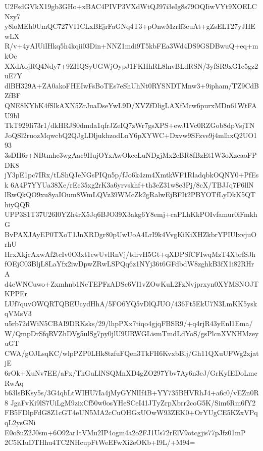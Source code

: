 U2FsdGVkX19gb3GHo+xBAC4PIVP3VXdWtQJ97i3eIg8s79OQIiwVYt9XOELCNzy7
y8loMEh0UmQC727VI1CLxBEjrFaGNq4T3+pOnwMzrff3euAt+gZsELT27yJHEwLX
R/v+4yAIUiIHkq5h4kqii03Din+NNZ1mdi9T5kbFEa3Wd4DS9GSDBwuQ+eq+mkOc
XXdAojRQ4Ndy7+9ZHQSyUGWjOypJ1FKHhRL8lnvBLdRSN/3yfSR9xG1e5gz2uE7Y
dlBH329A+ZA0akoFHEIwFsBoTEs7eShUhNt0RYSNDTMnw3+9ipham/TZ9CdBZfBF
QNE8KYhK4fSlkAXN5ZrJuaDseYwL9D/XVZfDligLAXfMcw6purxMDn61WtFAU9bl
TkT929Ii73r1/dkHRJS0dmda1qfrJZeIQ7zWr7gsXPS+ewJ1Vc0RZGob8dpVsjTN
JoQSl2ruozMqwcbQ2QJgLDljukhzodLnY6pXYWC+Dxvw9SFzve9j4mlhxQ2UO193
3sDH6r+NBtmhc3wgAac9HujOYxAwOkccLuNDgjMx2eBR8fBzEt1W3oXzcaoFPDK8
jY3pE1pc7IRx/tLShQJeNGsPIQn5p/fJo6k4zm4XmtkWF1RladqbkOQNY0+PfEsk
6A4P7YYUa38Xe/rEc35xg2rK3a6yrvskhf+th3eZ31w8e3Pj/8cX/TBJJq7F6llN
lRwQkQO9xu8yaIOum8WmLQVz39WMcZk2gRalwEjBFIt2PBYOTfLyDkK5QThiyQQR
UPP3S1T37U26I0YZh4rX5Jq6BJO39X3akg6Y8emj+caPLhKkPOIvfamur0iFmkhG
BvPAXJAyEP0TXoT1JnXRDgr80pUwUoA4LrI9k4VvgKiKiXHZkbrYPIUlxvjuOrhU
HrxXkjcAxwAf2tcIv0O3xt1cwUvlRnVj/tdrvH5Gt+qXDPSfCFIwqMzT4XbrfSJh
fOEjC03BljL8LaYfx2iwDpwZRwLSPQq6z1NYj36t6GFdbdW8zghkB3fX1i82RHrA
d4eWNCuwo+Zxmhnb1NeTEPFzADSc6Vl1vZOwKuL2FzNvjprxyn0XYMSNOJTKPPEr
LUf7quvOWQRTQBEUcydHhA/5FO6YQ5vDlQJUO/436Ft5EkU7N3LmKK5yskqVMsV3
u5rb72dWiN5CBAI9DRKsks/29/lhpPXx7tiqo4gjqFBSR9/+q4rjR43yEnl1Ema/
W/QmpDrSfqRVZhDVg5ulSg7py0jlU9URWGLismTmdLdYoS/gsPlcnXVNHMzeyuGT
CWA/gOJLsqKC/wlpPZP0LHk8tzfuFQen3TkFH6KvxbBlj/Gh11QXuUFWg2xjatjE
6rOk+XuNv7EE/aFx/TkGuLlNSQMnXD4gZO297Ybv7Ay6n3eJ/GrKyIEDoLmcRwAq
b63lsBKsy5s/3G4qbLtWIHU7Ia4jMyGYNlIf4B+YY735BHVRhJ4+a6c0/vEZn0R8
JgaFvKi9lS7UiLgM9zixCf50w0osYHeSCeI41JTyZrpXbrr2coG5K/Sim6Rm6fY2
FB5FDlpFdG8Z1cGT4eUN5MA2cCuOHGxUOwW93ZEK0+OrYUgCE5KZxVPqqL2ysGNi
E0o8uZ2J0sm+6O92ar1tVMu2IP4ogm4a2o2FJ1Us72rElV9otcgjis77pJfz01mP
2C5KIuDTHhu4TC2NHcupFtWeEFwXi2eOKb+I9L/+M94=
